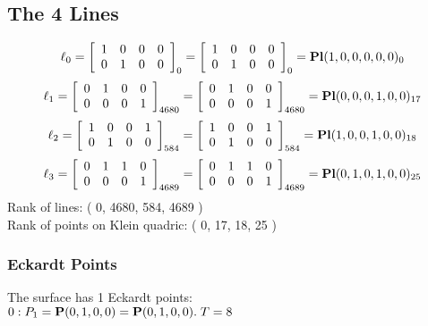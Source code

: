 \documentclass{article}
\newcommand{\bP}{{\bf P}}
\begin{document}
{\subsection*{The 4 Lines}
$$
\ell_{0} = 
\left[
\begin{array}{*{4}{r}}
1 & 0 & 0 & 0\\
0 & 1 & 0 & 0\\
\end{array}
\right]
_{0}
=
\left[
\begin{array}{*{4}c}
1  & 0  & 0  & 0\\
0  & 1  & 0  & 0\\
\end{array}
\right]_{0}
={\rm\bf Pl}(1,0,0,0,0,0 )_{0}$$
$$
\ell_{1} = 
\left[
\begin{array}{*{4}{r}}
0 & 1 & 0 & 0\\
0 & 0 & 0 & 1\\
\end{array}
\right]
_{4680}
=
\left[
\begin{array}{*{4}c}
0  & 1  & 0  & 0\\
0  & 0  & 0  & 1\\
\end{array}
\right]_{4680}
={\rm\bf Pl}(0,0,0,1,0,0 )_{17}$$
$$
\ell_{2} = 
\left[
\begin{array}{*{4}{r}}
1 & 0 & 0 & 1\\
0 & 1 & 0 & 0\\
\end{array}
\right]
_{584}
=
\left[
\begin{array}{*{4}c}
1  & 0  & 0  & 1\\
0  & 1  & 0  & 0\\
\end{array}
\right]_{584}
={\rm\bf Pl}(1,0,0,1,0,0 )_{18}$$
$$
\ell_{3} = 
\left[
\begin{array}{*{4}{r}}
0 & 1 & 1 & 0\\
0 & 0 & 0 & 1\\
\end{array}
\right]
_{4689}
=
\left[
\begin{array}{*{4}c}
0  & 1  & 1  & 0\\
0  & 0  & 0  & 1\\
\end{array}
\right]_{4689}
={\rm\bf Pl}(0,1,0,1,0,0 )_{25}$$
Rank of lines: ( 0, 4680, 584, 4689 )\\
Rank of points on Klein quadric: ( 0, 17, 18, 25 )\\
\subsubsection*{Eckardt Points}
The surface has 1 Eckardt points:\\
$0 : P_{1}=\bP(0, 1, 0, 0) = \bP(0, 1, 0, 0).\; T= 8$\\
}
\end{document}
